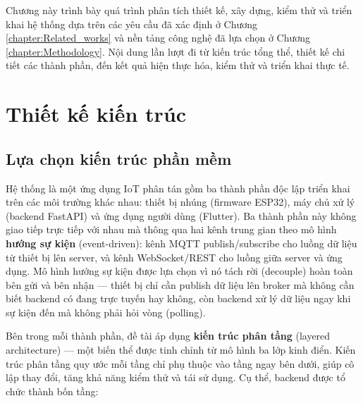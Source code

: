 \documentclass[../DoAn.tex]{subfiles}
\begin{document}
    \providecommand{\hinhcho}[1]{\fbox{\begin{minipage}[c][5.5cm][c]{0.85\textwidth}\centering\textit{[#1]}\end{minipage}}}

    Chương này trình bày quá trình phân tích thiết kế, xây dựng, kiểm thử và triển khai hệ thống dựa trên các yêu cầu đã xác định ở Chương \ref{chapter:Related_works} và nền tảng công nghệ đã lựa chọn ở Chương \ref{chapter:Methodology}. Nội dung lần lượt đi từ kiến trúc tổng thể, thiết kế chi tiết các thành phần, đến kết quả hiện thực hóa, kiểm thử và triển khai thực tế.

    \section{Thiết kế kiến trúc}

    \subsection{Lựa chọn kiến trúc phần mềm}

    Hệ thống là một ứng dụng IoT phân tán gồm ba thành phần độc lập triển khai trên các môi trường khác nhau: thiết bị nhúng (firmware ESP32), máy chủ xử lý (backend FastAPI) và ứng dụng người dùng (Flutter). Ba thành phần này không giao tiếp trực tiếp với nhau mà thông qua hai kênh trung gian theo mô hình \textbf{hướng sự kiện} (event-driven): kênh MQTT publish/subscribe cho luồng dữ liệu từ thiết bị lên server, và kênh WebSocket/REST cho luồng giữa server và ứng dụng. Mô hình hướng sự kiện được lựa chọn vì nó tách rời (decouple) hoàn toàn bên gửi và bên nhận — thiết bị chỉ cần publish dữ liệu lên broker mà không cần biết backend có đang trực tuyến hay không, còn backend xử lý dữ liệu ngay khi sự kiện đến mà không phải hỏi vòng (polling).

    Bên trong mỗi thành phần, đề tài áp dụng \textbf{kiến trúc phân tầng} (layered architecture) — một biến thể được tinh chỉnh từ mô hình ba lớp kinh điển. Kiến trúc phân tầng quy ước mỗi tầng chỉ phụ thuộc vào tầng ngay bên dưới, giúp cô lập thay đổi, tăng khả năng kiểm thử và tái sử dụng. Cụ thể, backend được tổ chức thành bốn tầng:
\end{document}
